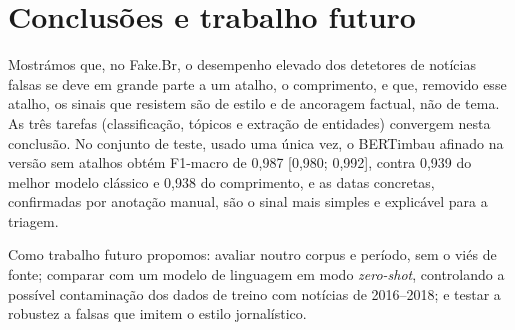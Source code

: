 \section{Conclusões e trabalho futuro}\label{sec:conclusao}

Mostrámos que, no Fake.Br, o desempenho elevado dos detetores de notícias falsas se deve em grande
parte a um atalho, o comprimento, e que, removido esse atalho, os sinais que resistem são de estilo
e de ancoragem factual, não de tema. As três tarefas (classificação, tópicos e extração de
entidades) convergem nesta conclusão. No conjunto de teste, usado uma única vez, o BERTimbau afinado
na versão sem atalhos obtém F1-macro de 0,987 [0,980; 0,992], contra 0,939 do melhor modelo
clássico e 0,938 do comprimento, e as datas concretas, confirmadas por anotação manual, são o sinal
mais simples e explicável para a triagem.

Como trabalho futuro propomos: avaliar noutro corpus e período, sem o viés de fonte; comparar com
um modelo de linguagem em modo \emph{zero-shot}, controlando a possível contaminação dos dados de
treino com notícias de 2016--2018; e testar a robustez a falsas que imitem o estilo jornalístico.

